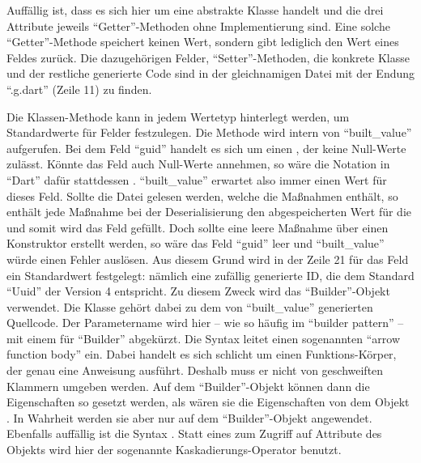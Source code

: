 Auffällig ist, dass es sich hier um eine abstrakte Klasse handelt und die drei Attribute jeweils \enquote{Getter}-Methoden ohne Implementierung sind.
Eine solche \enquote{Getter}-Methode speichert keinen Wert, sondern gibt lediglich den Wert eines Feldes zurück.
Die dazugehörigen Felder, \enquote{Setter}-Methoden, die konkrete Klasse und der restliche generierte Code sind in der gleichnamigen Datei mit der Endung \enquote{.g.dart} (Zeile 11) zu finden.

Die Klassen-Methode  kann in jedem Wertetyp hinterlegt werden, um Standardwerte für Felder festzulegen.
Die Methode wird intern von \enquote{built_value} aufgerufen.
Bei dem Feld \enquote{guid} handelt es sich um einen , der keine Null-Werte zulässt.
Könnte das Feld auch Null-Werte annehmen, so wäre die Notation in \enquote{Dart} dafür stattdessen . \enquote{built_value} erwartet also immer einen Wert für dieses Feld.
Sollte die Datei gelesen werden,
welche die Maßnahmen enthält, so enthält jede Maßnahme bei der Deserialisierung den abgespeicherten Wert für die  und somit wird das Feld gefüllt.
Doch sollte eine leere Maßnahme über einen Konstruktor erstellt werden, so wäre das Feld \enquote{guid} leer und \enquote{built_value} würde einen Fehler auslösen.
Aus diesem Grund wird in der Zeile 21 für das Feld  ein Standardwert festgelegt: nämlich eine zufällig generierte ID, die dem Standard \enquote{Uuid} der Version 4 entspricht.
Zu diesem Zweck wird das \enquote{Builder}-Objekt verwendet.
Die Klasse  gehört dabei zu dem von \enquote{built_value} generierten Quellcode.
Der Parametername wird hier -- wie so häufig im \enquote{builder pattern} -- mit einem  für \enquote{Builder} abgekürzt.
Die Syntax \IC{=>} leitet  einen sogenannten \enquote{arrow function body} ein.
Dabei handelt es sich schlicht um einen Funktions-Körper, der genau eine Anweisung ausführt. Deshalb muss er nicht von geschweiften Klammern umgeben werden.
Auf dem \enquote{Builder}-Objekt können dann die Eigenschaften so gesetzt werden, als wären sie die Eigenschaften von dem Objekt .
In Wahrheit werden sie aber nur auf dem \enquote{Builder}-Objekt angewendet.
Ebenfalls auffällig ist die Syntax .
Statt eines  zum Zugriff auf Attribute des Objekts wird hier der sogenannte Kaskadierungs-Operator  benutzt.

